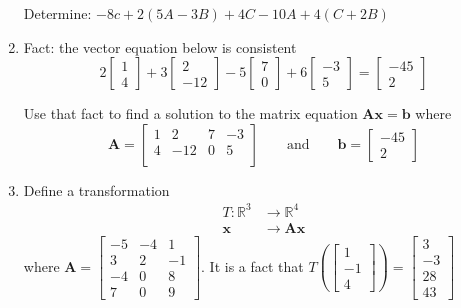\documentclass[basic]{inVerba-notes}
\begin{document}
\begin{enumerate}[align=left, leftmargin=0pt, labelindent=\parindent, listparindent=\parindent, labelwidth=0pt, itemindent=!]
  \medskip
  
  \hspace{58pt} Determine: \( -8c + 2(5A-3B) + 4C - 10A + 4(C+2B) \)

  \newpage

  \item {} Fact: the vector equation below is consistent
  \[%
  2 \begin{bmatrix} 1 \\ 4\end{bmatrix} + 
  3 \begin{bmatrix} 2 \\ -12 \end{bmatrix} -
  5 \begin{bmatrix} 7 \\ 0 \end{bmatrix} + 
  6 \begin{bmatrix} -3 \\ 5 \end{bmatrix} =
  \begin{bmatrix} -45 \\ 2 \end{bmatrix}
  \]%

  Use that fact to find a solution to the matrix equation \(\bm{Ax} = \bm{b }\) where 
  \[%
  \bm{A} = \begin{bmatrix}
  1 & 2 & 7 & -3 \\
  4 & -12 & 0 & 5 \\
  \end{bmatrix}
  \qquad \text{and} \qquad
  \bm{b} = \begin{bmatrix} -45 \\  2 \end{bmatrix}
  \]%
  
  \item {} Define a transformation 
  \begin{align*}
    T: \mathbb{R}^3 &\to \mathbb{R}^4 \\
    \bm{x} &\to \bm{Ax}
  \end{align*}
  where \(\bm{A} = \begin{bmatrix}
  -5 & -4 & 1 \\
  3 & 2 & -1 \\
  -4 & 0 & 8 \\
  7 & 0 & 9
  \end{bmatrix}\). 
  It is a fact that 
  \(%
  T\left(\begin{bmatrix} 1 \\ -1 \\ 4 \end{bmatrix}\right) = \begin{bmatrix} 3 \\ -3 \\ 28 \\ 43 \end{bmatrix}
  \)%
  

\end{enumerate}
\end{document}
